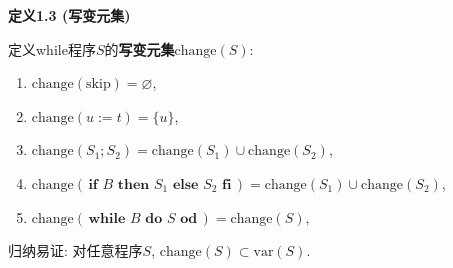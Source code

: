\documentclass[UTF8]{ctexart}
\begin{document}
\vspace{10pt}

\hypertarget{sec:定义1.3}{}
\noindent\textbf{定义1.3 (写变元集)}

定义while程序$S$的\textbf{写变元集}$\mathrm{change}(S)$:
\begin{enumerate}
    \item $\mathrm{change}(\mathrm{skip})=\varnothing$,
    \item $\mathrm{change}(u:=t)=\{u\}$,
    \item $\mathrm{change}(S_1;S_2)=\mathrm{change}(S_1)\cup\mathrm{change}(S_2)$,
    \item $\mathrm{change}(\,\mathbf{if}\,\,B\,\,\mathbf{then}\,\,S_1\,\,
    \mathbf{else}\,\,S_2\,\,\mathbf{fi}\,)=
    \mathrm{change}(S_1)\cup\mathrm{change}(S_2)$,
    \item $\mathrm{change}(\,\mathbf{while}\,\,B\,\,\mathbf{do}\,\,S
    \,\,\mathbf{od}\,)=\mathrm{change}(S)$,
\end{enumerate}

\vspace{10pt}

归纳易证: 对任意程序$S$, $\mathrm{change}(S)\subset\mathrm{var}(S)$.
\end{document}
